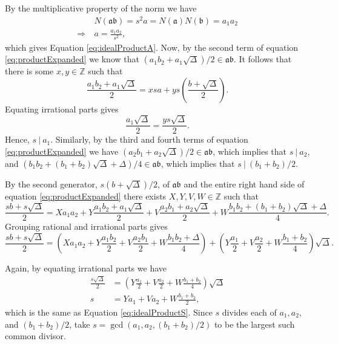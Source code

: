 \documentclass{ucalgthes1}
\theoremstyle{definition}
\newcommand{\ZZ}{\mathbb{Z}}
\begin{document}
\noindent
By the multiplicative property of the norm we have
\begin{align*}
	& N(\mathfrak{a}\mathfrak{b}) = s^2a = N(\mathfrak{a})N(\mathfrak{b}) = a_1 a_2 \\
	\Rightarrow~ & a = \frac{a_1a_2}{s^2},
\end{align*}
which gives Equation \eqref{eq:idealProductA}. Now, by the second term of equation \eqref{eq:productExpanded} we know that $(a_1b_2 + a_1\sqrt{\Delta})/2 \in \mathfrak{a}\mathfrak{b}$.  It follows that there is some $x,y \in \ZZ$ such that
\[
	\frac{a_1b_2 + a_1\sqrt{\Delta}}{2} = xsa + ys\left(\frac{b+\sqrt{\Delta}}{2}\right).
\]
Equating irrational parts gives
\begin{equation*}
	\frac{a_1\sqrt{\Delta}}{2} = \frac{ys\sqrt{\Delta}}{2}.
\end{equation*}
\noindent
Hence, $s ~|~ a_1$.  Similarly, by the third and fourth terms of equation \eqref{eq:productExpanded} we have $(a_2b_1+a_2\sqrt{\Delta})/2 \in \mathfrak{a}\mathfrak{b}$, which implies that $s~|~a_2$, and $(b_1b_2 + (b_1+b_2)\sqrt{\Delta} + \Delta)/4 \in \mathfrak{a}\mathfrak{b}$, which implies that $s~|~(b_1+b_2)/2$. 

By the second generator, $s(b+\sqrt\Delta)/2$, of $\mathfrak{a}\mathfrak{b}$ and the entire right hand side of equation \eqref{eq:productExpanded} there exists $X, Y, V, W \in \ZZ$ such that
\[
\frac{sb+s\sqrt\Delta}{2} = Xa_1a_2 + Y\frac{a_1b_2+a_1\sqrt\Delta}{2} + V\frac{a_2b_1 + a_2\sqrt{\Delta}}{2} + W\frac{b_1b_2 + (b_1+b_2)\sqrt{\Delta} + \Delta}{4}.
\]
Grouping rational and irrational parts gives
\begin{equation}
\label{eq:productSecond}
\frac{sb+s\sqrt\Delta}{2} = \left( Xa_1a_2 + Y\frac{a_1b_2}{2} + V\frac{a_2b_1}{2} + W\frac{b_1b_2 + \Delta}{4} \right) + \left(Y\frac{a_1}{2} + V\frac{a_2}{2} + W\frac{b_1+b_2}{4}\right)\sqrt\Delta. 
\end{equation}

\noindent
Again, by equating irrational parts we have
\begin{align}
	\frac{s\sqrt\Delta}{2} & = \left(Y\frac{a_1}{2} + V\frac{a_2}{2} + W\frac{b_1+b_2}{4}\right)\sqrt\Delta \nonumber \\
	s & = Ya_1 + Va_2 + W\frac{b_1+b_2}{2}, \label{eq:sAsGCD}
\end{align}
which is the same as Equation \eqref{eq:idealProductS}.  Since $s$ divides each of $a_1, a_2,$ and $(b_1+b_2)/2$, take $s = \gcd(a_1, a_2, (b_1+b_2)/2)$ to be the largest such common divisor.
\end{document}
